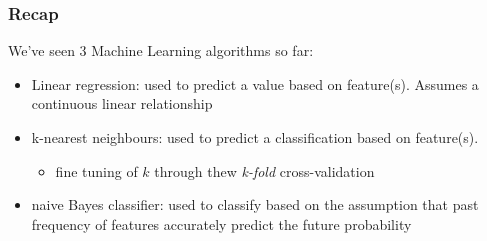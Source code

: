 \documentclass[xcolor=table]{beamer}
\begin{document}
\mdxtitleblockstart{}
\mdxauthorend\mdtitleauthorrunning{}{}\mdxtitleblockend%

\begin{mdframe}%

\frametitle{Recap}\label{heading-sec-recap}%

\noindent{}We've seen 3 Machine Learning algorithms so far:%

\begin{itemize}%

\item{}
Linear regression: used to predict a value based on feature(s). Assumes a continuous linear relationship%

\item{}
k-nearest neighbours: used to predict a classification based on feature(s).%

\begin{itemize}[noitemsep,topsep=\mdcompacttopsep]%

\item{}fine tuning of $k$ through thew \emph{k-fold} cross-validation%
\end{itemize}%

\item{}
naive Bayes classifier: used to classify based on the assumption that past frequency of features accurately predict the future probability%
\end{itemize}%
\end{mdframe}\label{sec-recap}%
\end{document}
